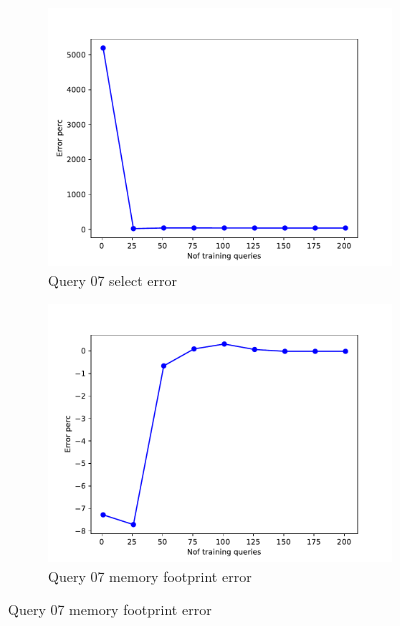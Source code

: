 \begin{figure}[!htb]
     \begin{subfigure}[t]{0.5\textwidth}
       \includegraphics[scale=0.4]{figs/tpch10/tpch10_sel07_error.pdf}
       \caption{Query 07 select error}
       \label{fig:tpch_sel07}
     \end{subfigure}
     \begin{subfigure}[t]{0.5\textwidth}
       \includegraphics[scale=0.4]{figs/tpch10/tpch10_q07_memerror.pdf}
       \caption{Query 07 memory footprint error}
       \label{fig:tpch_mem07}
     \end{subfigure}



\end{figure}
